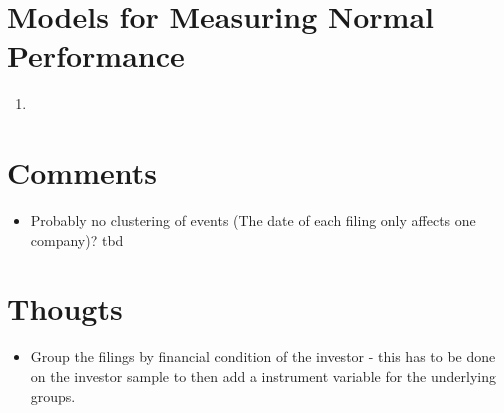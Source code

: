 \documentclass[12pt]{article}
\begin{document}
\section{Models for Measuring Normal Performance}
\begin{enumerate}
	\item 
\end{enumerate}

\section{Comments}

\begin{itemize}
	\item Probably no clustering of events (The date of each filing only affects one company)? tbd
\end{itemize}


\section{Thougts}

\begin{itemize}
	\item Group the filings by financial condition of the investor - this has to be done on the investor sample to then add a instrument variable for the underlying groups.
\end{itemize}
\end{document}
